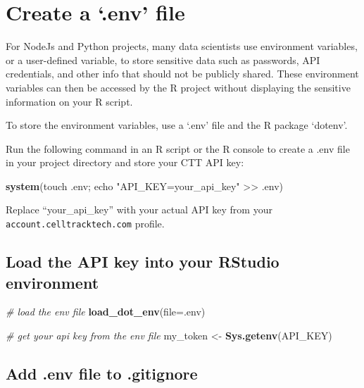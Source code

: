 \documentclass[
]{book}
\newenvironment{Shaded}{\begin{snugshade}}{\end{snugshade}}
\newcommand{\AttributeTok}[1]{\textcolor[rgb]{0.13,0.29,0.53}{#1}}
\newcommand{\CommentTok}[1]{\textcolor[rgb]{0.56,0.35,0.01}{\textit{#1}}}
\newcommand{\FunctionTok}[1]{\textcolor[rgb]{0.13,0.29,0.53}{\textbf{#1}}}
\newcommand{\NormalTok}[1]{#1}
\newcommand{\OtherTok}[1]{\textcolor[rgb]{0.56,0.35,0.01}{#1}}
\newcommand{\StringTok}[1]{\textcolor[rgb]{0.31,0.60,0.02}{#1}}
\begin{document}
\section{Create a `.env' file}\label{create-a-.env-file}

For NodeJs and Python projects, many data scientists use environment variables, or a user-defined variable, to store sensitive data such as passwords, API credentials, and other info that should not be publicly shared. These environment variables can then be accessed by the R project without displaying the sensitive information on your R script.

To store the environment variables, use a `.env' file and the R package `dotenv'.

Run the following command in an R script or the R console to create a .env file in your project directory and store your CTT API key:

\begin{Shaded}
\begin{Highlighting}[]
\FunctionTok{system}\NormalTok{(}\StringTok{\textquotesingle{}touch .env; echo "API\_KEY=your\_api\_key" \textgreater{}\textgreater{} .env\textquotesingle{}}\NormalTok{)}
\end{Highlighting}
\end{Shaded}

Replace ``your\_api\_key'' with your actual API key from your \texttt{account.celltracktech.com} profile.

\subsection{Load the API key into your RStudio environment}\label{load-the-api-key-into-your-rstudio-environment}

\begin{Shaded}
\begin{Highlighting}[]
\CommentTok{\# load the env file}
\FunctionTok{load\_dot\_env}\NormalTok{(}\AttributeTok{file=}\StringTok{\textquotesingle{}.env\textquotesingle{}}\NormalTok{)}

\CommentTok{\# get your api key from the env file}
\NormalTok{my\_token }\OtherTok{\textless{}{-}} \FunctionTok{Sys.getenv}\NormalTok{(}\StringTok{\textquotesingle{}API\_KEY\textquotesingle{}}\NormalTok{)}
\end{Highlighting}
\end{Shaded}

\subsection{Add .env file to .gitignore}\label{add-.env-file-to-.gitignore}
\end{document}
